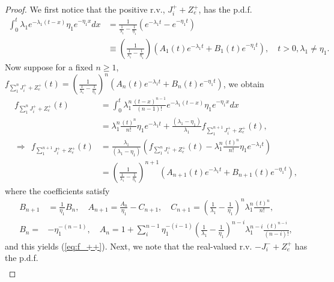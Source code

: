 \documentclass[11pt]{article}
\numberwithin{equation}{section}
\numberwithin{theorem}{section}
\begin{document}
\begin{proof}
We first notice that  the positive  r.v., $J_{i}^{+}+Z_{e}^{+}$,  has the p.d.f.
\begin{align*}
 \int_{0}^{t}\lambda_{1}e^{-\lambda_{1}\left(t-x\right)}\eta_{1}e^{-\eta_{1}x}dx 
 & =\frac{1}{\frac{1}{\lambda_{1}}-\frac{1}{\eta_{1}}}\left(e^{-\lambda_{1}t}-e^{-\eta_{1}t}\right)\\
 & \equiv\left(\frac{1}{\frac{1}{\lambda_{1}}-\frac{1}{\eta_{1}}}\right)\left(A_1(t)e^{-\lambda_{1}t}+B_1(t)e^{-\eta_{1}t}\right), \quad t>0, \lambda_1 \neq \eta_1.
\end{align*}
 Now suppose   for a fixed $n\ge 1$, $f_{\sum_{1}^{n}J_{i}^{+}+Z_{e}^{+}}\left(t\right)=\left(\frac{1}{\frac{1}{\lambda_{1}}-\frac{1}{\eta_{1}}}\right)^{n}\left(A_n(t)e^{-\lambda_{1}t}+B_n(t)e^{-\eta_{1}t}\right)$,
we obtain 
\begin{align*}
f_{\sum_{1}^{n}J_{i}^{+}+Z_{e}^{+}}\left(t\right) & =\int_{0}^{t}\lambda_{1}^{n}\frac{\left(t-x\right)^{n-1}}{\left(n-1\right)!}e^{-\lambda_{1}\left(t-x\right)}\eta_{1}e^{-\eta_{1}x}dx\\
 & =\lambda_{1}^{n}\frac{\left(t\right)^{n}}{n!}\eta_{1}e^{-\lambda_{1}t}+\frac{\left(\lambda_{1}-\eta_{1}\right)}{\lambda_{1}}f_{\sum_{1}^{n+1}J_{i}^{+}+Z_{e}^{+}}\left(t\right),\\
\Longrightarrow\ \ f_{\sum_{1}^{n+1}J_{i}^{+}+Z_{e}^{+}}\left(t\right) & =\frac{\lambda_{1}}{\left(\lambda_{1}-\eta_{1}\right)}\left(f_{\sum_{1}^{n}J_{i}^{+}+Z_{e}^{+}}\left(t\right)-\lambda_{1}^{n}\frac{\left(t\right)^{n}}{n!}\eta_{1}e^{-\lambda_{1}t}\right)\\
 & =\left(\frac{1}{\frac{1}{\lambda_{1}}-\frac{1}{\eta_{1}}}\right)^{n+1}\left(A_{n+1}(t)e^{-\lambda_{1}t}+B_{n+1}(t)e^{-\eta_{1}t}\right) ,
\end{align*}
 where the coefficients satisfy 
\begin{align*}
B_{n+1} & =\frac{1}{\eta_{1}}B_n, \quad A_{n+1}=\frac{A_n}{\eta_{1}}-C_{n+1}, \quad C_{n+1}=\left(\frac{1}{\lambda_{1}}-\frac{1}{\eta_{1}}\right)^{n}\lambda_{1}^{n}\frac{\left(t\right)^{n}}{n!},\\
B_n= & -\eta_{1}^{-\left(n-1\right)}, \quad A_n=1+\sum_{i}^{n-1}\eta_{1}^{-\left(i-1\right)}\left(\frac{1}{\lambda_{1}}-\frac{1}{\eta_{1}}\right)^{n-i}\lambda_{1}^{n-i}\frac{\left(t\right)^{n-i}}{\left(n-i\right)!},
\end{align*} 
 and this yields (\ref{eq:f_++}). Next, we note that  the real-valued r.v. $-J_{i}^{-}+Z_{e}^{+}$ has the p.d.f.
\begin{align*}

\end{align*}
\end{proof}
\end{document}
